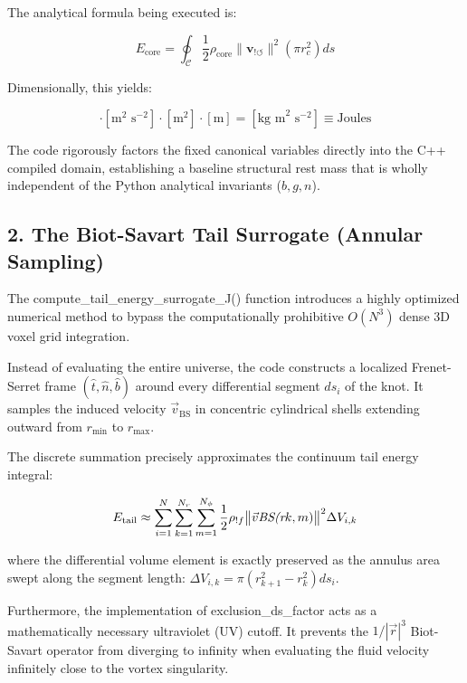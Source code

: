 \documentclass[11pt]{article}
\begin{document}
The analytical formula being executed is:

\begin{equation}
E_{\text{core}} = \oint_{\mathcal{C}} \frac{1}{2} \rho_{\text{core}} \bigl\lVert\mathbf{v}_{!\boldsymbol{\circlearrowleft}}\bigr\rVert^2 \left(\pi r_c^2\right) ds
\end{equation}

Dimensionally, this yields:

\begin{equation}
[\text{kg m}^{-3}] \cdot [\text{m}^2 \text{ s}^{-2}] \cdot [\text{m}^2] \cdot [\text{m}] = [\text{kg m}^2 \text{ s}^{-2}] \equiv \text{Joules}
\end{equation}

The code rigorously factors the fixed canonical variables directly into the C++ compiled domain, establishing a baseline structural rest mass that is wholly independent of the Python analytical invariants ($b, g, n$).

\subsection*{2. The Biot-Savart Tail Surrogate (Annular Sampling)}
The compute_tail_energy_surrogate_J() function introduces a highly optimized numerical method to bypass the computationally prohibitive $O(N^3)$ dense 3D voxel grid integration.

Instead of evaluating the entire universe, the code constructs a localized Frenet-Serret frame $(\hat{t}, \hat{n}, \hat{b})$ around every differential segment $ds_i$ of the knot. It samples the induced velocity $\vec{v}_{\text{BS}}$ in concentric cylindrical shells extending outward from $r_{\min}$ to $r_{\max}$.

The discrete summation precisely approximates the continuum tail energy integral:

\begin{equation}
E_{\text{tail}} \approx \sum_{i=1}^{N} \sum_{k=1}^{N_r} \sum_{m=1}^{N_\phi} \frac{1}{2} \rho_{!f} \bigl\lVert\vec{v}\textit{{\text{BS}}(r}{k,m})\bigr\rVert^2 \Delta V_{i,k}
\end{equation}

where the differential volume element is exactly preserved as the annulus area swept along the segment length: $\Delta V_{i,k} = \pi (r_{k+1}^2 - r_k^2) ds_i$.

Furthermore, the implementation of exclusion_ds_factor acts as a mathematically necessary ultraviolet (UV) cutoff. It prevents the $1/|\vec{r}|^3$ Biot-Savart operator from diverging to infinity when evaluating the fluid velocity infinitely close to the vortex singularity.
\end{document}
